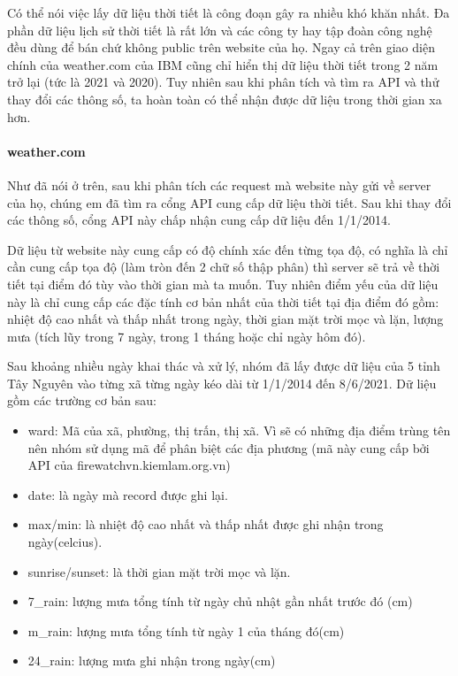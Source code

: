 \documentclass{article}
\begin{document}
\qquad Có thể nói việc lấy dữ liệu thời tiết là công đoạn gây ra nhiều khó khăn nhất. Đa phần dữ liệu lịch sử thời tiết là rất lớn và các công ty hay tập đoàn công nghệ đều dùng để bán chứ không public trên website của họ. Ngay cả trên giao diện chính của weather.com của IBM cũng chỉ hiển thị dữ liệu thời tiết trong 2 năm trở lại (tức là 2021 và 2020). Tuy nhiên sau khi phân tích và tìm ra API và thử thay đổi các thông số, ta hoàn toàn có thể nhận được dữ liệu trong thời gian xa hơn.

\paragraph{weather.com}
Như đã nói ở trên, sau khi phân tích các request mà website này gửi về server của họ, chúng em đã tìm ra cổng API cung cấp dữ liệu thời tiết. Sau khi thay đổi các thông số, cổng API này chấp nhận cung cấp dữ liệu đến 1/1/2014.

Dữ liệu từ website này cung cấp có độ chính xác đến từng tọa độ, có nghĩa là chỉ cần cung cấp tọa độ (làm tròn đến 2 chữ số thập phân) thì server sẽ trả về thời tiết tại điểm đó tùy vào thời gian mà ta muốn. Tuy nhiên điểm yếu của dữ liệu này là chỉ cung cấp các đặc tính cơ bản nhất của thời tiết tại địa điểm đó gồm: nhiệt độ cao nhất và thấp nhất trong ngày, thời gian mặt trời mọc và lặn, lượng mưa (tích lũy trong 7 ngày, trong 1 tháng hoặc chỉ ngày hôm đó).

Sau khoảng nhiều ngày khai thác và xử lý, nhóm đã lấy được dữ liệu của 5 tỉnh Tây Nguyên vào từng xã từng ngày kéo dài từ 1/1/2014 đến 8/6/2021. Dữ liệu gồm các trường cơ bản sau:

\begin{itemize}
      \item ward: Mã của xã, phường, thị trấn, thị xã. Vì sẽ có những địa điểm trùng tên nên nhóm sử dụng mã để phân biệt các địa phương (mã này cung cấp bởi API của firewatchvn.kiemlam.org.vn\cite{website:firewatch-administrative})
      \item date: là ngày mà record được ghi lại.
      \item max/min: là nhiệt độ cao nhất và thấp nhất được ghi nhận trong ngày(celcius).
      \item sunrise/sunset: là thời gian mặt trời mọc và lặn.
      \item 7\_rain: lượng mưa tổng tính từ ngày chủ nhật gần nhất trước đó (cm)
      \item m\_rain: lượng mưa tổng tính từ ngày 1 của tháng đó(cm)
      \item 24\_rain: lượng mưa ghi nhận trong ngày(cm)
\end{itemize}
\end{document}
